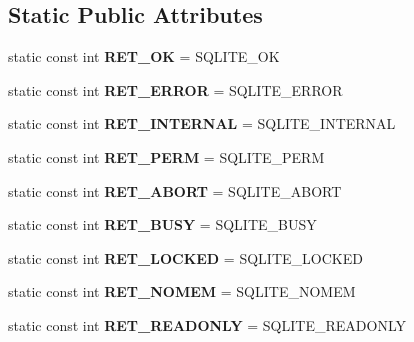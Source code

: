 \subsection*{Static Public Attributes}
\begin{DoxyCompactItemize}
\item 
\hypertarget{class_database_a42111ce8d1048e8f2f4287516b223a34}{
static const int {\bfseries RET\_\-OK} = SQLITE\_\-OK}
\label{class_database_a42111ce8d1048e8f2f4287516b223a34}

\item 
\hypertarget{class_database_ae859867896f50a88cf0001d1e5ee2196}{
static const int {\bfseries RET\_\-ERROR} = SQLITE\_\-ERROR}
\label{class_database_ae859867896f50a88cf0001d1e5ee2196}

\item 
\hypertarget{class_database_ad65975119fd4984c924275157ffa3c9f}{
static const int {\bfseries RET\_\-INTERNAL} = SQLITE\_\-INTERNAL}
\label{class_database_ad65975119fd4984c924275157ffa3c9f}

\item 
\hypertarget{class_database_a01f2a921d8f55194ed94405fc3a884ab}{
static const int {\bfseries RET\_\-PERM} = SQLITE\_\-PERM}
\label{class_database_a01f2a921d8f55194ed94405fc3a884ab}

\item 
\hypertarget{class_database_ae1d0e8f2af97e0feb29108eb31d066f6}{
static const int {\bfseries RET\_\-ABORT} = SQLITE\_\-ABORT}
\label{class_database_ae1d0e8f2af97e0feb29108eb31d066f6}

\item 
\hypertarget{class_database_aaf87a3bc4d2bf2f382ae829611cb42de}{
static const int {\bfseries RET\_\-BUSY} = SQLITE\_\-BUSY}
\label{class_database_aaf87a3bc4d2bf2f382ae829611cb42de}

\item 
\hypertarget{class_database_a602104a7071ac6725aaf9985613af122}{
static const int {\bfseries RET\_\-LOCKED} = SQLITE\_\-LOCKED}
\label{class_database_a602104a7071ac6725aaf9985613af122}

\item 
\hypertarget{class_database_a497f9224175d3f64860f59e8275db652}{
static const int {\bfseries RET\_\-NOMEM} = SQLITE\_\-NOMEM}
\label{class_database_a497f9224175d3f64860f59e8275db652}

\item 
\hypertarget{class_database_adefe1fa4c8ffd0f759f4cfb3e76612e5}{
static const int {\bfseries RET\_\-READONLY} = SQLITE\_\-READONLY}
\label{class_database_adefe1fa4c8ffd0f759f4cfb3e76612e5}


\end{DoxyCompactItemize}

